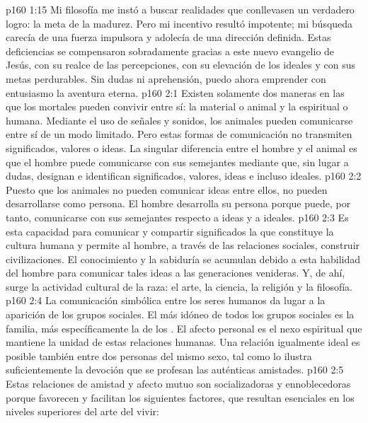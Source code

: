 \vs p160 1:15 Mi filosofía me instó a buscar realidades que conllevasen un verdadero logro: la meta de la madurez. Pero mi incentivo resultó impotente; mi búsqueda carecía de una fuerza impulsora y adolecía de una dirección definida. Estas deficiencias se compensaron sobradamente gracias a este nuevo evangelio de Jesús, con su realce de las percepciones, con su elevación de los ideales y con sus metas perdurables. Sin dudas ni aprehensión, puedo ahora emprender con entusiasmo la aventura eterna.
\vs p160 2:1 Existen solamente dos maneras en las que los mortales pueden convivir entre sí: la material o animal y la espiritual o humana. Mediante el uso de señales y sonidos, los animales pueden comunicarse entre sí de un modo limitado. Pero estas formas de comunicación no transmiten significados, valores o ideas. La singular diferencia entre el hombre y el animal es que el hombre puede comunicarse con sus semejantes mediante  que, sin lugar a dudas, designan e identifican significados, valores, ideas e incluso ideales.
\vs p160 2:2 Puesto que los animales no pueden comunicar ideas entre ellos, no pueden desarrollarse como persona. El hombre desarrolla su persona porque puede, por tanto, comunicarse con sus semejantes respecto a ideas y a ideales.
\vs p160 2:3 Es esta capacidad para comunicar y compartir significados la que constituye la cultura humana y permite al hombre, a través de las relaciones sociales, construir civilizaciones. El conocimiento y la sabiduría se acumulan debido a esta habilidad del hombre para comunicar tales ideas a las generaciones venideras. Y, de ahí, surge la actividad cultural de la raza: el arte, la ciencia, la religión y la filosofía.
\vs p160 2:4 La comunicación simbólica entre los seres humanos da lugar a la aparición de los grupos sociales. El más idóneo de todos los grupos sociales es la familia, más específicamente la de los . El afecto personal es el nexo espiritual que mantiene la unidad de estas relaciones humanas. Una relación igualmente ideal es posible también entre dos personas del mismo sexo, tal como lo ilustra suficientemente la devoción que se profesan las auténticas amistades.
\vs p160 2:5 Estas relaciones de amistad y afecto mutuo son socializadoras y ennoblecedoras porque favorecen y facilitan los siguientes factores, que resultan esenciales en los niveles superiores del arte del vivir:
